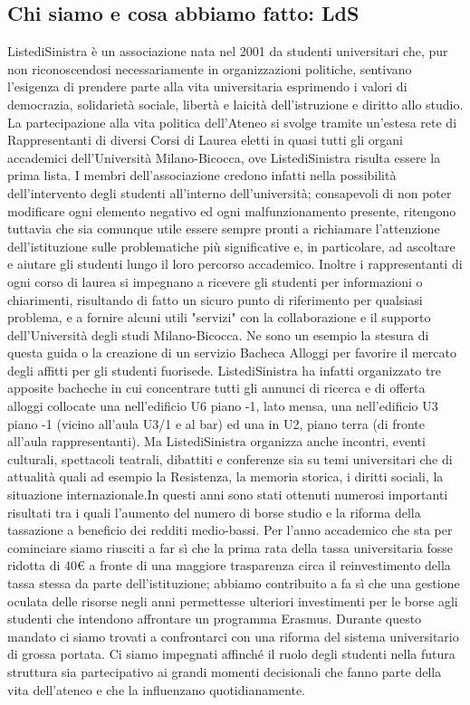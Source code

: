 \subsection{Chi siamo e cosa abbiamo fatto: LdS}
ListediSinistra è un associazione nata nel 2001 da studenti universitari che, pur non riconoscendosi necessariamente in organizzazioni politiche, sentivano l'esigenza di prendere parte alla vita universitaria esprimendo i valori di democrazia, solidarietà sociale, libertà e laicità dell'istruzione e diritto allo studio.
La partecipazione alla vita politica dell'Ateneo si svolge tramite un'estesa rete di Rappresentanti di diversi Corsi di Laurea eletti in quasi tutti gli organi accademici dell'Università Milano-Bicocca, ove ListediSinistra risulta essere la prima lista.
I membri dell'associazione credono infatti nella possibilità dell'intervento degli studenti all'interno dell'università; consapevoli di non poter modificare ogni elemento negativo ed ogni malfunzionamento presente, ritengono tuttavia che sia comunque utile essere sempre pronti a richiamare l'attenzione dell'istituzione sulle problematiche più significative e, in particolare, ad ascoltare e aiutare gli studenti lungo il loro percorso accademico.
Inoltre i rappresentanti di ogni corso di laurea si impegnano a ricevere gli studenti per informazioni o chiarimenti, risultando di fatto un sicuro punto di riferimento per qualsiasi problema, e a fornire alcuni utili "servizi" con la collaborazione e il supporto dell'Università degli studi Milano-Bicocca.
Ne sono un esempio la stesura di questa guida o la creazione di un servizio Bacheca Alloggi per favorire il mercato degli affitti per gli studenti fuorisede.
ListediSinistra ha infatti organizzato tre apposite bacheche in cui concentrare tutti gli annunci di ricerca e di offerta alloggi collocate una nell'edificio U6 piano -1, lato mensa, una nell'edificio U3 piano -1 (vicino all'aula U3/1 e al bar) ed una in U2, piano terra (di fronte all’aula rappresentanti).
Ma ListediSinistra organizza anche incontri, eventi culturali, spettacoli teatrali, dibattiti e conferenze sia su temi universitari che di attualità quali ad esempio la Resistenza, la memoria storica, i diritti sociali, la situazione internazionale.In questi anni sono stati ottenuti numerosi importanti risultati tra i quali l'aumento del numero di borse studio e la riforma della tassazione a beneficio dei redditi medio-bassi. Per l'anno accademico che sta per cominciare siamo riusciti a far sì che la prima rata della tassa universitaria fosse ridotta di 40€ a fronte di una maggiore trasparenza circa il reinvestimento della tassa stessa da parte dell'istituzione; abbiamo contribuito a fa sì che una gestione oculata delle risorse negli anni permettesse ulteriori investimenti per le borse agli studenti che intendono affrontare un programma Erasmus. Durante questo mandato ci siamo trovati a confrontarci con una riforma del sistema universitario di grossa portata. Ci siamo impegnati affinché il ruolo degli studenti nella futura struttura sia partecipativo ai grandi momenti decisionali che fanno parte della vita dell'ateneo e che la influenzano quotidianamente.

